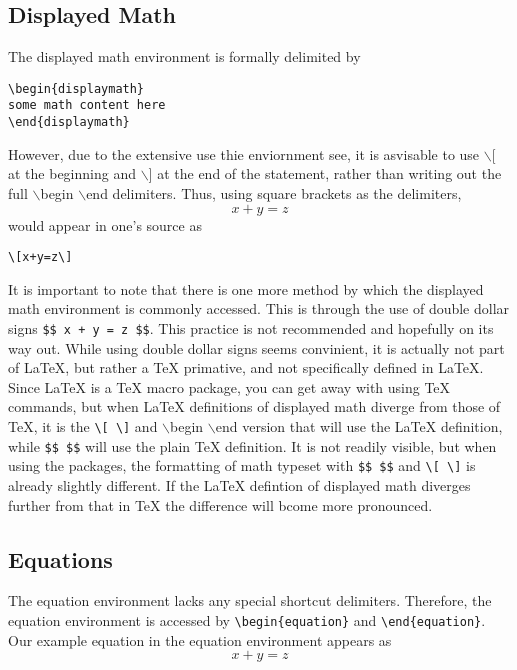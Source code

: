 \subsection{Displayed Math}
\label{sec:displayed-math}

The displayed math environment is formally delimited by
\begin{verbatim}
\begin{displaymath}
some math content here
\end{displaymath}
\end{verbatim}
However, due to the extensive use thie enviornment see, it is
asvisable to use $\backslash [$ at the beginning and
$\backslash ]$ at the end of the statement, rather than writing out the
full $\backslash$begin $\backslash$end delimiters. Thus, using square
brackets as the delimiters, \[x+y=z\] would appear in one's source as
\begin{verbatim}
\[x+y=z\]
\end{verbatim}

It is important to note that there is one more method by which the
displayed math environment is commonly accessed. This is through
the use of double dollar signs \verb!$$ x + y = z $$!. This practice
is not recommended and hopefully on its way out. While using double
dollar signs seems convinient, it is actually not part of \LaTeX,
but rather a \TeX{} primative, and not specifically defined in \LaTeX.
Since \LaTeX{} is a \TeX{} macro package, you can get away with using
\TeX{} commands, but when \LaTeX{} definitions of displayed math
diverge from those of \TeX{}, it is the \verb=\[ \]= and
$\backslash$begin $\backslash$end version that will use the \LaTeX{}
definition, while \verb=$$ $$= will use the plain \TeX{} definition.
It is not readily visible, but when using the \AmS{} packages, the
formatting of math typeset with \verb=$$ $$= and \verb=\[ \]= is
already slightly different. If the \LaTeX{} defintion of displayed
math diverges further from that in \TeX{} the difference will
bcome more pronounced.

\subsection{Equations}
\label{sec:equations}

The equation environment lacks any special shortcut delimiters.
Therefore, the equation environment
is accessed by \verb=\begin{equation}= and
\verb=\end{equation}=.  Our example equation in the equation
environment appears as
\begin{equation}
  \label{eq:1}
  x+y=z
\end{equation}

